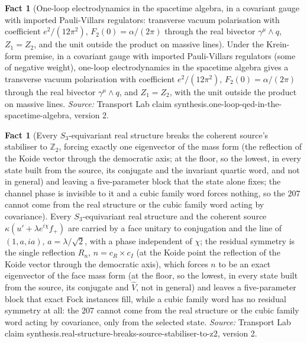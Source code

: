 \documentclass[11pt]{article}
\theoremstyle{definition}
\newtheorem{fact}[theorem]{Fact}
\theoremstyle{plain}
\begin{document}
\begin{fact}[One-loop electrodynamics in the spacetime algebra, in a covariant gauge with imported Pauli-Villars regulators: transverse vacuum polarisation with coefficient $e^{2}/(12\pi^{2})$, $F_{2}(0) = \alpha/(2\pi)$ through the real bivector $\gamma^{\mu} \wedge q$, $Z_{1} = Z_{2}$, and the unit outside the product on massive lines]\label{c:synthesis.one-loop-qed-in-the-spacetime-algebra}
Under the Krein-form premise, in a covariant gauge with imported Pauli-Villars regulators (some of negative weight), one-loop electrodynamics in the spacetime algebra gives a transverse vacuum polarisation with coefficient $e^{2}/(12\pi^{2})$, $F_{2}(0) = \alpha/(2\pi)$ through the real bivector $\gamma^{\mu} \wedge q$, and $Z_{1} = Z_{2}$, with the unit outside the product on massive lines.
\emph{Source:} Transport Lab claim synthesis.one-loop-qed-in-the-spacetime-algebra, version 2.
\end{fact}

\begin{fact}[Every $S_{3}$-equivariant real structure breaks the coherent source's stabiliser to $\mathbb{Z}_{2}$, forcing exactly one eigenvector of the mass form (the reflection of the Koide vector through the democratic axis; at the floor, so the lowest, in every state built from the source, its conjugate and the invariant quartic word, and not in general) and leaving a five-parameter block that the state alone fixes; the channel phase is invisible to it and a cubic family word forces nothing, so the $207$ cannot come from the real structure or the cubic family word acting by covariance]\label{c:synthesis.real-structure-breaks-source-stabiliser-to-z2}
Every $S_{3}$-equivariant real structure and the coherent source $\kappa(u' + \lambda e^{i\chi}f_{+})$ are carried by a face unitary to conjugation and the line of $(1, a, ia)$, $a = \lambda/\sqrt2$, with a phase independent of $\chi$; the residual symmetry is the single reflection $R_{n}$, $n = c_{R}\times c_{I}$ (at the Koide point the reflection of the Koide vector through the democratic axis), which forces $n$ to be an exact eigenvector of the face mass form (at the floor, so the lowest, in every state built from the source, its conjugate and $\hat{V}$, not in general) and leaves a five-parameter block that exact Fock instances fill, while a cubic family word has no residual symmetry at all: the $207$ cannot come from the real structure or the cubic family word acting by covariance, only from the selected state.
\emph{Source:} Transport Lab claim synthesis.real-structure-breaks-source-stabiliser-to-z2, version 2.
\end{fact}
\end{document}
